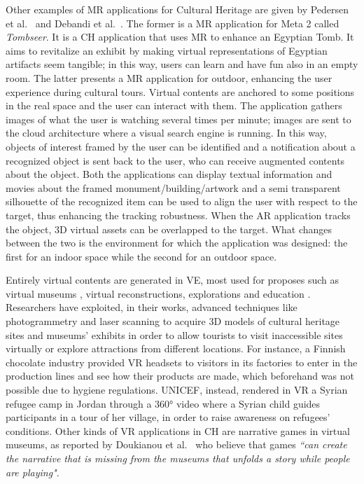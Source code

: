 Other examples of MR applications for Cultural Heritage are given by Pedersen et al.~\cite{pedersen_more_2017} and Debandi et al.~\cite{debandi_enhancing_2018}.
The former is a MR application for Meta 2 called \textit{Tombseer}. It is a CH application that uses MR to enhance an Egyptian Tomb. It aims to revitalize an exhibit by making virtual representations of Egyptian artifacts seem tangible; in this way, users can learn and have fun also in an empty room.
The latter presents a MR application for outdoor, enhancing the user experience during cultural tours. Virtual contents are anchored to some positions in the real space and the user can interact with them. The application gathers images of what the user is watching several times per minute; images are sent to the cloud architecture where a visual search engine is running. In this way, objects of interest framed by the user can be identified and a notification about a recognized object is sent back to the user, who can receive augmented contents about the object. 
Both the applications can display textual information and movies about the framed monument/building/artwork and a semi transparent silhouette of the recognized item can be used to align the user with respect to the target, thus enhancing the tracking robustness. When the AR application tracks the object, 3D virtual assets can be overlapped to the target. What changes between the two is the environment for which the application was designed: the first for an indoor space while the second for an outdoor space.

Entirely virtual contents are generated in VE, most used for proposes such as virtual museums \cite{doukianou_beyond_2020}, virtual reconstructions, explorations and education \cite{bekele_survey_2018}. Researchers have exploited, in their works, advanced techniques like photogrammetry and laser scanning to acquire 3D models of cultural heritage sites and museums' exhibits in order to allow tourists to visit inaccessible sites virtually or explore attractions from different locations. 
For instance, a Finnish chocolate industry provided VR headsets to visitors in its factories to enter in the production lines and see how their products are made, which beforehand was not possible due to hygiene regulations. UNICEF, instead, rendered in VR a Syrian refugee camp in Jordan through a 360° video where a Syrian child guides participants in a tour of her village, in order to raise awareness on refugees' conditions.
Other kinds of VR applications in CH are narrative games in virtual museums, as reported by Doukianou et al.~\cite{doukianou_beyond_2020} who believe that games \textit{“can create the narrative that is missing from the museums that unfolds a story while people are playing"}.

